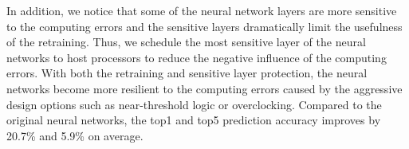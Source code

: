 In addition, we notice that some of the neural network layers
are more sensitive to the computing errors and the sensitive
layers dramatically limit the usefulness of the retraining. Thus,
we schedule the most sensitive layer of the neural networks
to host processors to reduce the negative influence of the
computing errors. With both the retraining and sensitive layer
protection, the neural networks become more resilient to the
computing errors caused by the aggressive design options
such as near-threshold logic or overclocking. Compared to the
original neural networks, the top1 and top5 prediction accuracy
improves by 20.7\% and 5.9\% on average.

%
%
%

